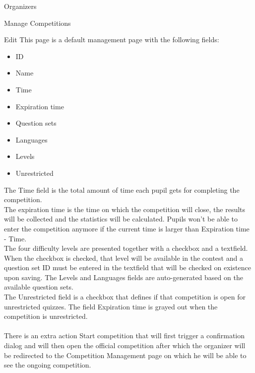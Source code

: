 \begin{section}{Organizers}
\begin{subsection}{Manage Competitions}
		\begin{subsubsection}{Edit}
			This page is a default management page with the following fields:
			\begin{itemize}
				\item ID
				\item Name
				\item Time
				\item Expiration time
				\item Question sets
				\item Languages
				\item Levels
				\item Unrestricted
			\end{itemize}
			The Time field is the total amount of time each pupil gets for completing
			the competition.\\
			The expiration time is the time on which the competition will close,
			the results will be collected and the statistics will be calculated.
			Pupils won't be able to enter the competition anymore if the
			current time is larger than Expiration time - Time.\\
			The four difficulty levels are presented together with a checkbox and a
			textfield. When the checkbox is checked, that level will be available in the
			contest and a question set ID must be entered in the textfield that will be
			checked on existence upon saving.
			The Levels and Languages fields are auto-generated based on the
			available question sets. \\
			The Unrestricted field is a checkbox that defines if that competition is open
			for unrestricted quizzes. The field Expiration time is grayed out when the
			competition is unrestricted.\\
			\\
			There is an extra action Start competition that will first trigger a
			confirmation dialog and will then open the official competition after which
			the organizer will be redirected to the Competition Management page on which
			he will be able to see the ongoing competition.
		\end{subsubsection}
	\end{subsection}
	

\end{section}
